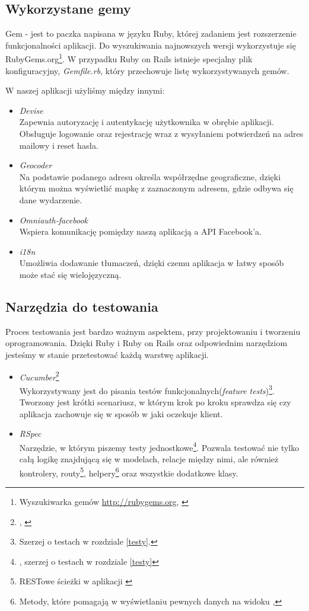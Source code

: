   \subsection{Wykorzystane gemy}
    Gem - jest to paczka napisana w języku Ruby, której zadaniem jest rozszerzenie funkcjonalności aplikacji. Do wyszukiwania najnowszych wersji wykorzystuje się RubyGems.org\footnote{Wyszukiwarka gemów \url{http://rubygems.org}, \cite{rubydoc}}. W przypadku Ruby on Rails istnieje specjalny plik konfiguracyjny, \emph{Gemfile.rb}, który przechowuje listę wykorzystywanych gemów.

    W naszej aplikacji użyliśmy między innymi:
    \begin{itemize}
      \item \emph{Devise} \\ Zapewnia autoryzację i autentykację użytkownika w obrębie aplikacji. Obsługuje logowanie oraz rejestrację wraz z wysyłaniem potwierdzeń na adres mailowy i reset hasła.
      \item \emph{Geocoder} \\ Na podstawie podanego adresu określa współrzędne geograficzne, dzięki którym można wyświetlić mapkę z zaznaczonym adresem, gdzie odbywa się dane wydarzenie.
      \item \emph{Omniauth-facebook} \\ Wspiera komunikację pomiędzy naszą aplikacją a API Facebook'a.
      \item \emph{i18n} \\ Umożliwia dodawanie tłumaczeń, dzięki czemu aplikacja w łatwy sposób może stać się wielojęzyczną.
    \end{itemize}

  \subsection{Narzędzia do testowania}
    Proces testowania jest bardzo ważnym aspektem, przy projektowaniu i tworzeniu oprogramowania. Dzięki Ruby i Ruby on Rails oraz odpowiednim narzędziom jesteśmy w stanie przetestować każdą warstwę aplikacji.

    \begin{itemize}
      \item \emph{Cucumber}\footnote{\cite{cucumber}, \cite{testing_tuesday} } \\ 
      Wykorzystywany jest do pisania testów funkcjonalnych(\emph{feature tests})\footnote{Szerzej o testach w rozdziale \ref{testy}.}. Tworzony jest krótki scenariusz, w którym krok po kroku sprawdza się czy aplikacja zachowuje się w sposób w jaki oczekuje klient.
      \item \emph{RSpec} \\ 
      Narzędzie, w którym piszemy testy jednostkowe\footnote{\cite{rspec}, szerzej o testach w rozdziale \ref{testy}}. Pozwala testować nie tylko całą logikę znajdującą się w modelach, relacje między nimi, ale również kontrolery, routy\footnote{RESTowe ścieżki w aplikacji \cite{head_first}}, helpery\footnote{Metody, które pomagają w wyświetlaniu pewnych danych na widoku \cite{rspec},\cite{rails_guide}} oraz wszystkie dodatkowe klasy. 
    \end{itemize}

